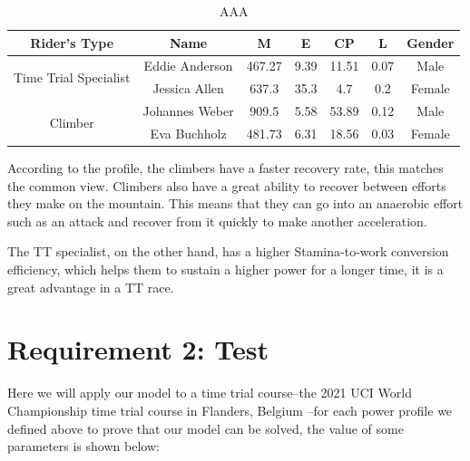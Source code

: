 \documentclass[12pt]{article}
\begin{document}
\begin{table}[h]
    \centering
    \begin{tabular}{@{}ccccccc@{}}
        \toprule
        Rider's Type                           & Name           & M      & E    & CP    & L    & Gender \\ \midrule
        \multirow{2}{*}{Time Trial Specialist} & Eddie Anderson & 467.27 & 9.39 & 11.51 & 0.07 & Male   \\
                                               & Jessica Allen  & 637.3  & 35.3 & 4.7   & 0.2  & Female \\
        \multirow{2}{*}{Climber}               & Johannes Weber & 909.5  & 5.58 & 53.89 & 0.12 & Male   \\
                                               & Eva Buchholz   & 481.73 & 6.31 & 18.56 & 0.03 & Female \\ \bottomrule
    \end{tabular}
    \caption{AAA}
\end{table}
According to the profile, the climbers have a faster recovery rate, this matches the common view. Climbers also have a great ability to recover between efforts they make on
the mountain. This means that they can go into an anaerobic effort such as an attack and recover from it quickly to make another acceleration.

The TT specialist, on the other hand, has a higher Stamina-to-work conversion efficiency, which helps them to sustain a higher power for a longer time, it is a great advantage
in a TT race.

\section{Requirement 2: Test}
Here we will apply our model to a time trial course--the 2021 UCI World Championship time trial course in Flanders, Belgium --for each power profile we defined
above to prove that our model can be solved, the value of some parameters is shown below:
\end{document}
